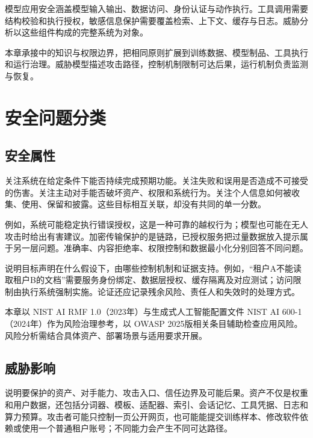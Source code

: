 \documentclass[../textbook.tex]{subfiles}
\begin{document}
\fi
{}

模型应用安全涵盖模型输入输出、数据访问、身份认证与动作执行。工具调用需要结构校验和执行授权，敏感信息保护需要覆盖检索、上下文、缓存与日志。威胁分析以这些组件构成的完整系统为对象。

本章承接中的知识与权限边界，把相同原则扩展到训练数据、模型制品、工具执行和运行治理。威胁模型描述攻击路径，控制机制限制可达后果，运行机制负责监测与恢复。

\section{安全问题分类}

\subsection{安全属性}
关注系统在给定条件下能否持续完成预期功能。关注失败和误用是否造成不可接受的伤害。关注主动对手能否破坏资产、权限和系统行为。关注个人信息如何被收集、使用、保留和披露。这些目标相互关联，却没有共同的单一分数。

例如，系统可能稳定执行错误授权，这是一种可靠的越权行为；模型也可能在无人攻击时给出有害建议。加密传输保护的是链路，已授权服务把过量数据放入提示属于另一层问题。准确率、内容拒绝率、权限控制和数据最小化分别回答不同问题。

说明目标声明在什么假设下，由哪些控制机制和证据支持。例如，“租户A不能读取租户B的文档”需要服务身份绑定、数据层授权、缓存隔离及对应测试；访问限制由执行系统强制实施。论证还应记录残余风险、责任人和失效时的处理方式。

本章以 NIST AI RMF 1.0（2023年）与生成式人工智能配置文件 NIST AI 600-1（2024年）作为风险治理参考，以 OWASP 2025版相关条目辅助检查应用风险\cite{nist2023airmf,nist2024genaiprofile,owasp2025promptinjection}。风险分析需结合具体资产、部署场景与适用要求开展。

\subsection{威胁影响}
说明要保护的资产、对手能力、攻击入口、信任边界及可能后果。资产不仅是权重和用户数据，还包括分词器、模板、适配器、索引、会话记忆、工具凭据、日志和算力预算。攻击者可能只控制一页公开网页，也可能能提交训练样本、修改软件依赖或使用一个普通租户账号；不同能力会产生不同可达路径。
\end{document}
